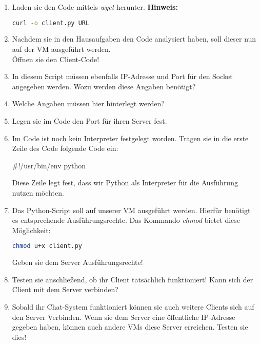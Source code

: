 \documentclass[paper=a4,fontsize=11pt]{scrartcl}%
\numberwithin{equation}{section}
\begin{document}
\begin{enumerate}
\begin{enumerate}
		\item Laden sie den Code mittels \emph{wget} herunter.
		\textbf{Hinweis:}
		\begin{lstlisting}[style=Bash, language=Bash]
curl -o client.py URL
		\end{lstlisting}
		\item Nachdem sie in den Hausaufgaben den Code analysiert haben, soll dieser nun auf der VM ausgeführt werden.\\
		Öffnen sie den Client-Code!
		\item In diesem Script müssen ebenfalls IP-Adresse und Port für den Socket angegeben werden. Wozu werden diese Angaben benötigt?
		\item Welche Angaben müssen hier hinterlegt werden?
		\item Legen sie im Code den Port für ihren Server fest.
		\item Im Code ist noch kein Interpreter festgelegt worden. Tragen sie in die erste Zeile des Code folgende Code ein:
		\begin{python}
#!/usr/bin/env python
		\end{python}
		Diese Zeile legt fest, dass wir Python als Interpreter für die Ausführung nutzen möchten.
		\item Das Python-Script soll auf unserer VM ausgeführt werden. Hierfür benötigt es entsprechende Ausführungsrechte. Das Kommando \emph{chmod} bietet diese Möglichkeit:\\
		\begin{lstlisting}[style=Bash, language=Bash]
chmod u+x client.py
		\end{lstlisting}
		Geben sie dem Server Ausführungsrechte!
		\item Testen sie anschließend, ob ihr Client tatsächlich funktioniert! Kann sich der Client mit dem Server verbinden?
		\item Sobald ihr Chat-System funktioniert können sie auch weitere Clients sich auf den Server Verbinden. Wenn sie dem Server eine öffentliche IP-Adresse gegeben haben, können auch andere VMs diese Server erreichen. Testen sie dies!
	\end{enumerate}
\end{enumerate}
\end{document}
